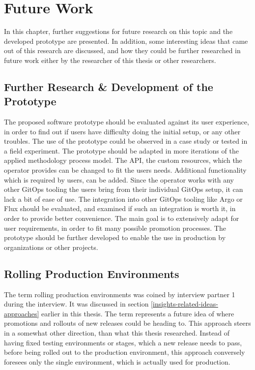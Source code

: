 \chapter{Future Work}
\label{future-work}

In this chapter,
further suggestions for future research on this topic and the developed prototype are presented.
In addition,
some interesting ideas that came out of this research are discussed,
and how they could be further researched in future work either by the researcher of this thesis or other researchers.



\section*{Further Research \& Development of the Prototype}

The proposed software prototype should be evaluated against its user experience,
in order to find out if users have difficulty doing the initial setup,
or any other troubles.
The use of the prototype could be observed in a case study or tested in a field experiment.
The prototype should be adapted in more iterations of the applied methodology process model.
%
The API, the custom resources, which the operator provides can be changed to fit the users needs.
Additional functionality which is required by users, can be added.
Since the operator works with any other GitOps tooling the users bring from their individual GitOps setup,
it can lack a bit of ease of use. The integration into other GitOps tooling like Argo or Flux
should be evaluated, and examined if such an integration is worth it, in order to provide better convenience.
%
The main goal is to extensively adapt for user requirements, in order to fit
many possible promotion processes.
The prototype should be further developed to enable the use in production by organizations or other projects.

\section*{Rolling Production Environments}

The term rolling production environments was coined by interview partner 1 during the interview.
It was discussed in section \ref{insights-related-ideas-approaches} earlier in this thesis.
The term represents a future idea of where promotions and rollouts of new releases could be heading to.
This approach steers in a somewhat other direction, than what this thesis researched.
Instead of having fixed testing environments or stages, which a new release needs to pass,
before being rolled out to the production environment,
this approach conversely foresees only the single environment,
which is actually used for production.

